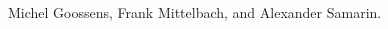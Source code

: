 \begin{thebibliography}{99}

\label{odkaz}
Michel Goossens, Frank Mittelbach, and Alexander Samarin.

\end{thebibliography}
